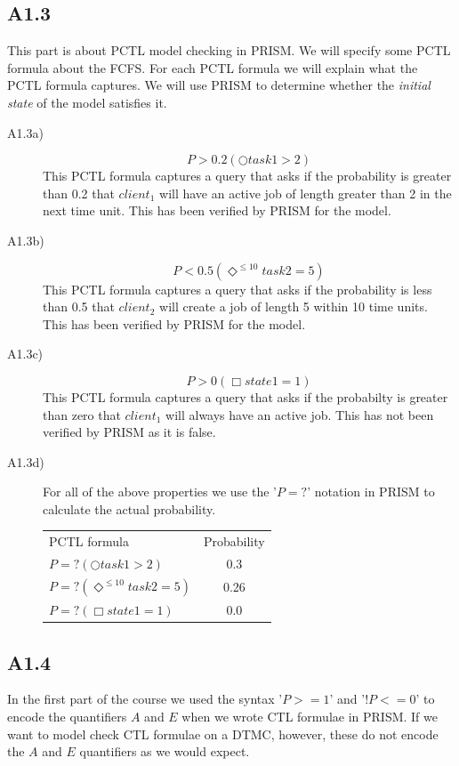 \documentclass[12pt]{report}
\begin{document}
\subsection*{A1.3}
This part is about PCTL model checking in PRISM. We will specify some PCTL formula about the FCFS. For each PCTL formula we will explain what the PCTL formula captures. We will use PRISM to determine whether the \emph{initial state} of the model satisfies it.

\begin{description}
\item[A1.3a)] $$P > 0.2 (\bigcirc task1 > 2)$$
This PCTL formula captures a query that asks if the probability is greater than 0.2 that $client_1$ will have an active job of length greater than 2 in the next time unit. This has been verified by PRISM for the model.


\item[A1.3b)] $$P < 0.5 (\Diamond^{\leq10} task2=5)$$
This PCTL formula captures a query that asks if the probability is less than 0.5 that $client_2$ will create a job of length 5 within 10 time units. This has been verified by PRISM for the model.


\item[A1.3c)] $$P > 0 (\Box state1=1)$$
This PCTL formula captures a query that asks if the probabilty is greater than zero that $client_1$ will always have an active job. This has not been verified by PRISM as it is false.


\item[A1.3d)] For all of the above properties we use the '$P=?$' notation in PRISM to calculate the actual probability.
\begin{center}
\begin{tabular}{l c}
PCTL formula & Probability\\
$P=?(\bigcirc task1> 2)$ & 0.3\\
$P=?(\Diamond^{\leq10} task2=5)$ & 0.26\\
$P=?(\Box state1=1)$ & 0.0\\
\end{tabular}
\end{center}

\end{description}

\subsection*{A1.4}
In the first part of the course we used the syntax '$P>=1$' and '$!P<=0$' to encode the quantifiers $A$ and $E$ when we wrote CTL formulae in PRISM. If we want to model check CTL formulae on a DTMC, however, these do not encode the $A$ and $E$ quantifiers as we would expect.
\end{document}
